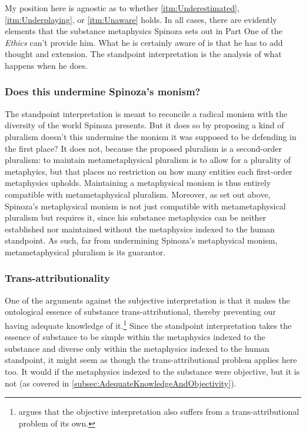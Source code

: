 \documentclass[11pt]{article}
\newcommand{\dash}{\unskip{---}}
\newcommand\texttitle[1]{\emph{#1}}
\begin{document}
	My position here is agnostic as to whether \ref{itm:Underestimated}, \ref{itm:Underplaying}, or \ref{itm:Unaware} holds. In all cases, there are evidently elements that the substance metaphysics Spinoza sets out in Part One of the \texttitle{Ethics} can't provide him. What he is certainly aware of is that he has to add thought and extension. The standpoint interpretation is the analysis of what happens when he does.
	
	
	\subsubsection{Does this undermine Spinoza’s monism?} \label{subsec:Monism}
	
	The standpoint interpretation is meant to reconcile a radical monism with the diversity of the world Spinoza presents. But it does so by proposing a kind of pluralism \dash doesn't this undermine the monism it was supposed to be defending in the first place? It does not, because the proposed pluralism is a second-order pluralism: to maintain metametaphysical pluralism is to allow for a plurality of metaphyics, but that places no restriction on how many entities each first-order metaphysics upholds. Maintaining a metaphysical monism is thus entirely compatible with metametaphysical pluralism. Moreover, as set out above, Spinoza's metaphysical monism is not just compatible with metametaphysical pluralism but requires it, since his substance metaphysics can be neither established nor maintained without the metaphysics indexed to the human standpoint. As such, far from undermining Spinoza's metaphysical monism, metametaphysical pluralism is its guarantor.

	
	\subsubsection{Trans-attributionality} \label{subsec:TransAttributionality}
	
	One of the arguments against the subjective interpretation is that it makes the ontological essence of substance trans-attributional, thereby preventing our having adequate knowledge of it.\footnote{\Textcite[511--512]{Shein2009} argues that the objective interpretation also suffers from a trans-attributional problem of its own.} Since the standpoint interpretation takes the essence of substance to be simple within the metaphysics indexed to the substance and diverse only within the metaphysics indexed to the human standpoint, it might seem as though the trans-attributional problem applies here too. It would if the metaphysics indexed to the substance were objective, but it is not (as covered in \autoref{subsec:AdequateKnowledgeAndObjectivity}).
	
\end{document}
